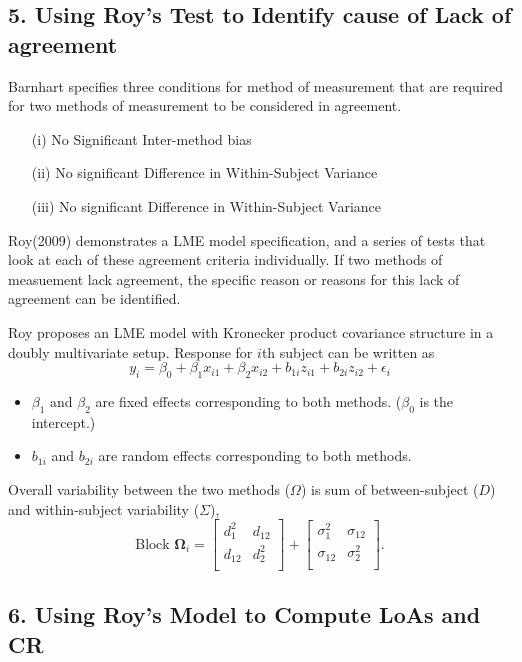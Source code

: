 \documentclass[Main.tex]{subfiles}
\begin{document}
\subsection*{5. Using Roy's Test to Identify cause of Lack of agreement}

Barnhart specifies three conditions for method of measurement that are required for two methods of measurement to be considered in agreement.

\begin{itemize}
\item[(i)] No Significant Inter-method bias
\item[(ii)] No significant Difference in Within-Subject Variance
\item[(iii)] No significant Difference in Within-Subject Variance 
\end{itemize}
  

Roy(2009) demonstrates a LME model specification, and a series of tests that look at each of these agreement criteria individually. If two methods of measuement lack agreement, the specific reason or reasons for this lack of agreement can be identified.


Roy proposes an LME model with Kronecker product covariance structure in a doubly multivariate setup. Response for $i$th subject can be written as
\[ y_i = \beta_0 + \beta_1x_{i1} + \beta_2x_{i2} + b_{1i}z_{i1}  + b_{2i}z_{i2} + \epsilon_i \]
\begin{itemize}
	\item $\beta_1$ and $\beta_2$ are fixed effects corresponding to both methods. ($\beta_0$ is the intercept.)
	\item $b_{1i}$ and $b_{2i}$ are random effects corresponding to both methods.
\end{itemize}

Overall variability between the two methods ($\Omega$) is sum of between-subject ($D$) and within-subject variability ($\Sigma$),
\[
\mbox{Block } \boldsymbol{\Omega}_i = \left[ \begin{array}{cc} d^2_1 & d_{12}\\ d_{12} & d^2_2\\ \end{array} \right]
+ \left[\begin{array}{cc} \sigma^2_1 & \sigma_{12}\\ \sigma_{12} & \sigma^2_2\\ \end{array}\right].
\]
\subsection*{6. Using Roy's Model to Compute LoAs and CR }
\end{document}

